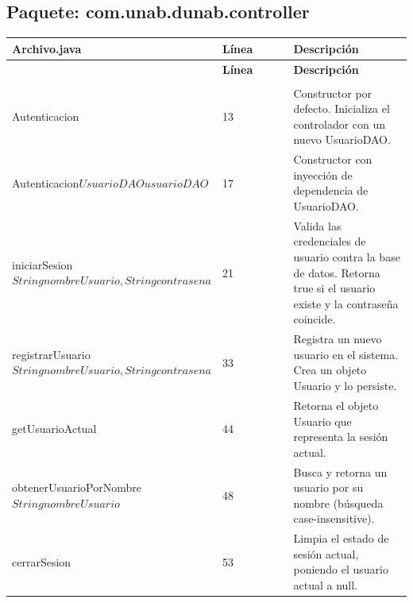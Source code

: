 \documentclass[utf8]{article}
\begin{document}
\subsection*{Paquete: com.unab.dunab.controller}

\begin{longtable}{p{0.18\linewidth}p{0.32\linewidth}p{0.5\linewidth}}
\hline
\textbf{Archivo.java} & \textbf{Línea} & \textbf{Descripción} \\ \hline
\endfirsthead}
\hline
\textbf{Archivo.java} & \textbf{Línea} & \textbf{Descripción} \\ \hline
\endhead
\hline
\endfoot
\hline
\endlastfoot}
\textbf{Autenticacion.java} & & \\ \hline
Autenticacion\(\) & 13 & Constructor por defecto. Inicializa el controlador con un nuevo UsuarioDAO. \\
Autenticacion\(UsuarioDAO usuarioDAO\) & 17 & Constructor con inyección de dependencia de UsuarioDAO. \\
iniciarSesion\(String nombreUsuario, String contrasena\) & 21 & Valida las credenciales de usuario contra la base de datos. Retorna true si el usuario existe y la contraseña coincide. \\
registrarUsuario\(String nombreUsuario, String contrasena\) & 33 & Registra un nuevo usuario en el sistema. Crea un objeto Usuario y lo persiste. \\
getUsuarioActual\(\) & 44 & Retorna el objeto Usuario que representa la sesión actual. \\
obtenerUsuarioPorNombre\(String nombreUsuario\) & 48 & Busca y retorna un usuario por su nombre (búsqueda case-insensitive). \\
cerrarSesion\(\) & 53 & Limpia el estado de sesión actual, poniendo el usuario actual a null. \\
\end{longtable}
\end{document}
